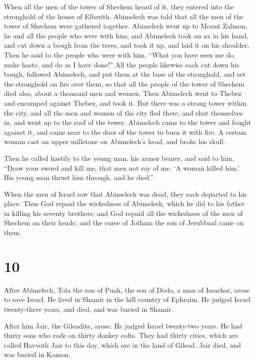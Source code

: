  When all the men of the tower of Shechem heard of it, they
entered into the stronghold of the house of Elberith. 
Abimelech was told that all the men of the tower of Shechem were
gathered together.  Abimelech went up to Mount Zalmon, he
and all the people who were with him; and Abimelech took an ax in his
hand, and cut down a bough from the trees, and took it up, and laid it
on his shoulder. Then he said to the people who were with him, ``What
you have seen me do, make haste, and do as I have done!'' 
All the people likewise each cut down his bough, followed Abimelech, and
put them at the base of the stronghold, and set the stronghold on fire
over them, so that all the people of the tower of Shechem died also,
about a thousand men and women.  Then Abimelech went to
Thebez and encamped against Thebez, and took it.  But there
was a strong tower within the city, and all the men and women of the
city fled there, and shut themselves in, and went up to the roof of the
tower.  Abimelech came to the tower and fought against it,
and came near to the door of the tower to burn it with fire.
 A certain woman cast an upper millstone on Abimelech's
head, and broke his skull.

 Then he called hastily to the young man, his armor bearer,
and said to him, ``Draw your sword and kill me, that men not say of me,
`A woman killed him.' His young man thrust him through, and he died.''

 When the men of Israel saw that Abimelech was dead, they
each departed to his place.  Thus God repaid the wickedness
of Abimelech, which he did to his father in killing his seventy
brothers;  and God repaid all the wickedness of the men of
Shechem on their heads; and the curse of Jotham the son of Jerubbaal
came on them.

\hypertarget{section-9}{%
\section{10}\label{section-9}}

 After Abimelech, Tola the son of Puah, the son of Dodo, a
man of Issachar, arose to save Israel. He lived in Shamir in the hill
country of Ephraim.  He judged Israel twenty-three years,
and died, and was buried in Shamir.

 After him Jair, the Gileadite, arose. He judged Israel
twenty-two years.  He had thirty sons who rode on thirty
donkey colts. They had thirty cities, which are called Havvoth Jair to
this day, which are in the land of Gilead.  Jair died, and
was buried in Kamon.


